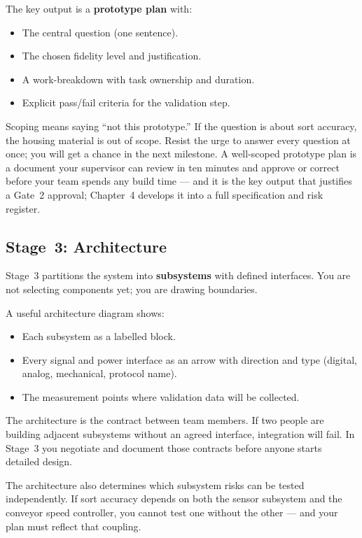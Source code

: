 The key output is a \textbf{prototype plan} with:
\begin{itemize}
  \item The central question (one sentence).
  \item The chosen fidelity level and justification.
  \item A work-breakdown with task ownership and duration.
  \item Explicit pass/fail criteria for the validation step.
\end{itemize}

Scoping means saying ``not this prototype.''
If the question is about sort accuracy, the housing material is out of scope.
Resist the urge to answer every question at once; you will get a chance in
the next milestone.
A well-scoped prototype plan is a document your supervisor can review in
ten minutes and approve or correct before your team spends any build time ---
and it is the key output that justifies a Gate~2 approval; Chapter~4
develops it into a full specification and risk register.

\subsection{Stage~3: Architecture}
\label{sec:ch3-stage3}

Stage~3 partitions the system into \textbf{subsystems} with
defined interfaces.
You are not selecting components yet; you are drawing boundaries.

A useful architecture diagram shows:
\begin{itemize}
  \item Each subsystem as a labelled block.
  \item Every signal and power interface as an arrow with direction and type
        (digital, analog, mechanical, protocol name).
  \item The measurement points where validation data will be collected.
\end{itemize}

The architecture is the contract between team members.
If two people are building adjacent subsystems without an agreed interface,
integration will fail.
In Stage~3 you negotiate and document those contracts before anyone starts
detailed design.

The architecture also determines which subsystem risks can be tested independently.
If sort accuracy depends on both the sensor subsystem and the conveyor speed
controller, you cannot test one without the other --- and your plan must
reflect that coupling.

